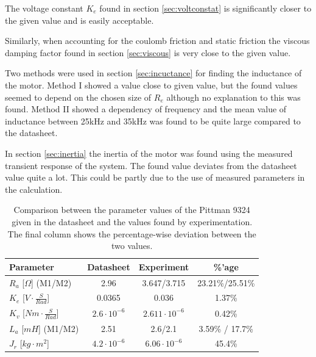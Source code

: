 \par
The voltage constant $K_e$ found in section \ref{sec:voltconstat} is significantly closer to the given value and is easily acceptable.

\par
Similarly, when accounting for the coulomb friction and static friction the viscous damping factor found in section \ref{sec:viscous} is very close to the given value.

\par
Two methods were used in section \ref{sec:incuctance} for finding the inductance of the motor.
Method I showed a value close to given value, but the found values seemed to depend on the chosen size of $R_e$ although no explanation to this was found. 
Method II showed a dependency of frequency and the mean value of inductance between 25kHz and 35kHz was found to be quite large compared to the datasheet.

\par
In section \ref{sec:inertia} the inertia of the motor was found using the measured transient response of the system.
The found value deviates from the datasheet value quite a lot. 
This could be partly due to the use of measured parameters in the calculation.

\begin{table}[!h]
	\centering
	\begin{tabular}{|l|c|c|c|}
		\hline
		Parameter & Datasheet & Experiment & \%'age\\
		\hline
		$R_a$ [$\Omega$] (M1/M2) & 2.96 & 3.647/3.715 & 23.21\%/25.51\%\\
		$K_e$ [$V\cdot\frac{S}{Rad}$]& 0.0365 & 0.036 & 1.37\%\\
		$K_v$ [$Nm\cdot\frac{S}{Rad}$]& $2.6\cdot10^{-6}$ & $2.611\cdot10^{-6}$ & 0.42\%\\
		$L_a$ [$mH$] (M1/M2)& 2.51 & 2.6/2.1 & 3.59\% / 17.7\%\\
		$J_r$ [$kg\cdot m^2$]& $4.2\cdot10^{-6}$& $6.06 \cdot10^{-6}$ & 45.4\%\\
		\hline
	\end{tabular}
	\caption[Comparison of parameter values.]{Comparison between the parameter values of the Pittman 9324 given in the datasheet and the values found by experimentation. The final column shows the percentage-wise deviation between the two values.}
	\label{tab:compare}
\end{table}
